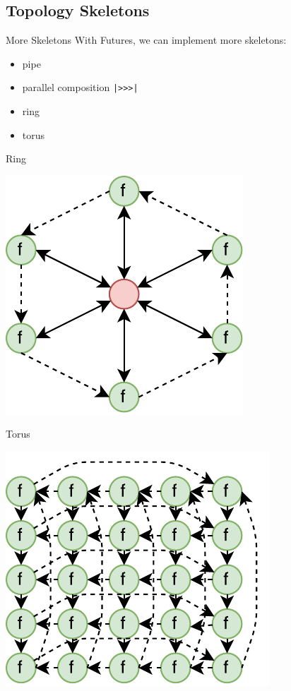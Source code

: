 \subsection{Topology Skeletons}

\begin{frame}[fragile]{More Skeletons}
With Futures, we can implement more skeletons:
\\
\begin{itemize}
\item pipe
\item parallel composition \lstinline{|>>>|}
\item ring
\item torus
\end{itemize}
\end{frame}

\begin{frame}[fragile]{Ring}
\begin{center}		
\includegraphics[scale=1]{images/ring}
\end{center}
\end{frame}

\begin{frame}[fragile]{Torus}
\begin{center}	
\includegraphics[scale=1]{images/torus}
\end{center}
\end{frame}